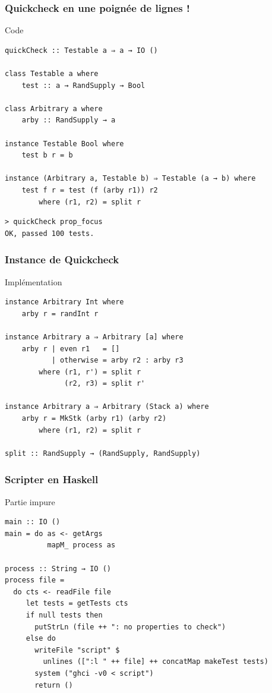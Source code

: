 \documentclass[10pt]{beamer}
\begin{document}
\begin{frame}[fragile]
\frametitle{Quickcheck en une poignée de lignes !}

\begin{block}{Code}
\begin{verbatim}
quickCheck :: Testable a ⇒ a → IO ()

class Testable a where
    test :: a → RandSupply → Bool

class Arbitrary a where
    arby :: RandSupply → a

instance Testable Bool where
    test b r = b

instance (Arbitrary a, Testable b) ⇒ Testable (a → b) where
    test f r = test (f (arby r1)) r2
        where (r1, r2) = split r
\end{verbatim}
\end{block}

\begin{verbatim}
> quickCheck prop_focus
OK, passed 100 tests.
\end{verbatim}

\end{frame}



\begin{frame}[fragile]
\frametitle{Instance de Quickcheck}
\begin{block}{Implémentation}
\begin{verbatim}
instance Arbitrary Int where
    arby r = randInt r

instance Arbitrary a ⇒ Arbitrary [a] where
    arby r | even r1   = []
           | otherwise = arby r2 : arby r3
        where (r1, r') = split r
              (r2, r3) = split r'

instance Arbitrary a ⇒ Arbitrary (Stack a) where
    arby r = MkStk (arby r1) (arby r2)
        where (r1, r2) = split r

split :: RandSupply → (RandSupply, RandSupply)
\end{verbatim}
\end{block}
\end{frame}



\begin{frame}[fragile]
\frametitle{Scripter en Haskell}
\begin{block}{Partie impure}
\begin{verbatim}
main :: IO ()
main = do as <- getArgs
          mapM_ process as

process :: String → IO ()
process file =
  do cts <- readFile file
     let tests = getTests cts
     if null tests then
       putStrLn (file ++ ": no properties to check")
     else do
       writeFile "script" $
         unlines ([":l " ++ file] ++ concatMap makeTest tests)
       system ("ghci -v0 < script")
       return ()
\end{verbatim}
\end{block}
\end{frame}
\end{document}
